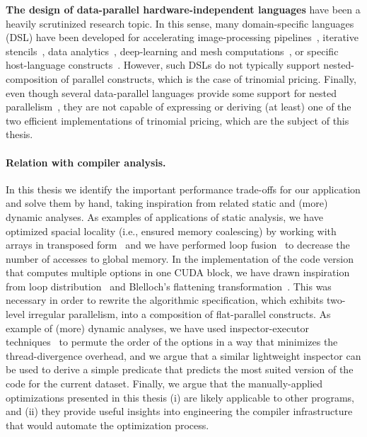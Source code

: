 {\bf The design of data-parallel hardware-independent languages} have been a heavily scrutinized research topic. In this sense, many domain-specific languages (DSL) have been developed for accelerating image-processing pipelines~\cite{Halide}, iterative stencils~\cite{tang2011pochoir}, data analytics~\cite{HPAT}, deep-learning and mesh computations~\cite{OP2-Mesh,DeliteDSLs}, or specific host-language constructs~\cite{Accelerate-ICFP,StreamJava8,svensson2011obsidian}. However, such DSLs do not typically support nested-composition of parallel constructs, which is the case of trinomial pricing. Finally, even though several data-parallel languages provide some support for nested parallelism~\cite{blelloch1994implementation,henriksen2017futhark}, they are not capable of expressing or deriving (at least) one of the two efficient implementations of trinomial pricing, which are the subject of this thesis.   



\paragraph{Relation with compiler analysis.} In this thesis we identify the important performance trade-offs for our application and solve them by hand, taking inspiration from related static and (more) dynamic analyses.  As examples of applications of static analysis, we have optimized spacial locality (i.e., ensured memory coalescing) by working with arrays in transposed form~\cite{LexiFiPricing} and we have performed loop fusion~\cite{PolyhedralOpt} to decrease the number of accesses to global memory. In the implementation of the code version that computes multiple options in one CUDA block, we have drawn inspiration from loop distribution~\cite{PolyhedralOpt} and Blelloch's flattening transformation~\cite{blelloch1994implementation}. This was necessary in order to rewrite the algorithmic specification, which exhibits two-level irregular parallelism, into a composition of flat-parallel constructs.  
%
As example of (more) dynamic analyses, we have used inspector-executor techniques~\cite{Strout:DataItReord,SummaryMonot} to permute the order of the options in a way that minimizes the thread-divergence overhead, and we argue that a similar lightweight inspector can be used to derive a simple predicate that predicts the most suited version of the code for the current dataset.
%
Finally, we argue that the manually-applied optimizations presented in this thesis (i) are likely applicable to other programs, and (ii) they provide useful insights into engineering the compiler infrastructure that would automate the optimization process.


